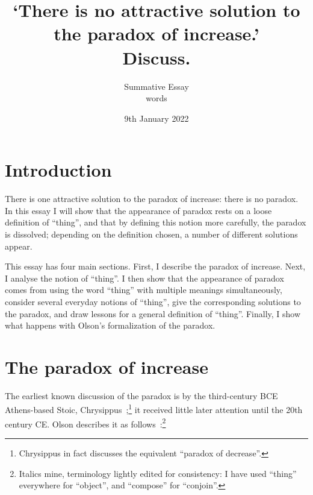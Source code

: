 \documentclass[english,a5paper]{scrartcl}
\begin{document}
\title{‘There is no attractive solution to the paradox of increase.’\\Discuss.}
\subtitle{Summative Essay\\words}
\date{9th January 2022}
\maketitle

\section{Introduction}

There is one attractive solution to the paradox of increase: there is no paradox. In this essay I will show that the appearance of paradox rests on a loose definition of “thing”, and that by defining this notion more carefully, the paradox is dissolved; depending on the definition chosen, a number of different solutions appear.

This essay has four main sections. First, I describe the paradox of increase. Next, I analyse the notion of “thing”. I then show that the appearance of paradox comes from using the word “thing” with multiple meanings simultaneously, consider several everyday notions of “thing”, give the corresponding solutions to the paradox, and draw lessons for a general definition of “thing”. Finally, I show what happens with Olson’s formalization of the paradox.

\section{The paradox of increase}

The earliest known discussion of the paradox is by the third-century BCE Athens-based Stoic, Chrysippus~\cite{moran10.1111/rati.12185};\footnote{Chrysippus in fact discusses the equivalent “paradox of decrease”.} it received little later attention until the 20th century CE. Olson describes it as follows~\cite[§1]{olson10.2307/27903994}:\footnote{Italics mine, terminology lightly edited for consistency: I have used “thing” everywhere for “object”, and “compose” for “conjoin”.}
\end{document}
